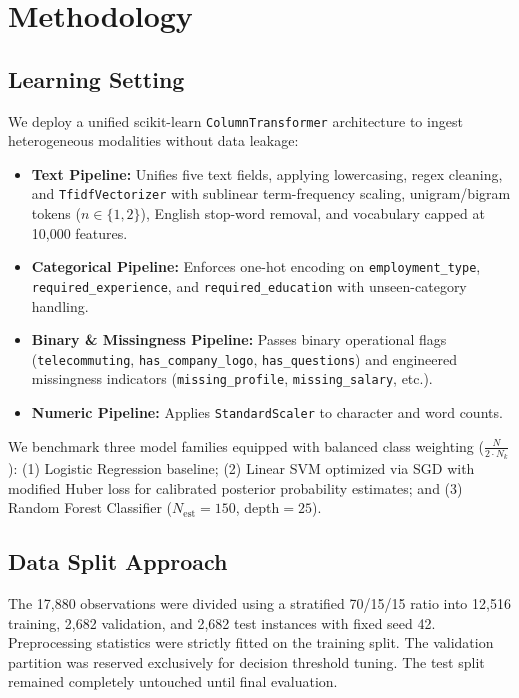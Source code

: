 \documentclass[conference]{IEEEtran}
\begin{document}
\section{Methodology}

\subsection{Learning Setting}
We deploy a unified scikit-learn \texttt{ColumnTransformer} architecture to ingest heterogeneous modalities without data leakage:
\begin{itemize}
    \item \textbf{Text Pipeline:} Unifies five text fields, applying lowercasing, regex cleaning, and \texttt{TfidfVectorizer} with sublinear term-frequency scaling, unigram/bigram tokens ($n \in \{1, 2\}$), English stop-word removal, and vocabulary capped at 10,000 features.
    \item \textbf{Categorical Pipeline:} Enforces one-hot encoding on \texttt{employment\_type}, \texttt{required\_experience}, and \texttt{required\_education} with unseen-category handling.
    \item \textbf{Binary \& Missingness Pipeline:} Passes binary operational flags (\texttt{telecommuting}, \texttt{has\_company\_logo}, \texttt{has\_questions}) and engineered missingness indicators (\texttt{missing\_profile}, \texttt{missing\_salary}, etc.).
    \item \textbf{Numeric Pipeline:} Applies \texttt{StandardScaler} to character and word counts.
\end{itemize}

We benchmark three model families equipped with balanced class weighting ($\frac{N}{2 \cdot N_k}$): (1) Logistic Regression baseline; (2) Linear SVM optimized via SGD with modified Huber loss for calibrated posterior probability estimates; and (3) Random Forest Classifier ($N_{\text{est}}=150$, depth$=25$).

\subsection{Data Split Approach}
The 17,880 observations were divided using a stratified 70/15/15 ratio into 12,516 training, 2,682 validation, and 2,682 test instances with fixed seed 42. Preprocessing statistics were strictly fitted on the training split. The validation partition was reserved exclusively for decision threshold tuning. The test split remained completely untouched until final evaluation.
\end{document}
